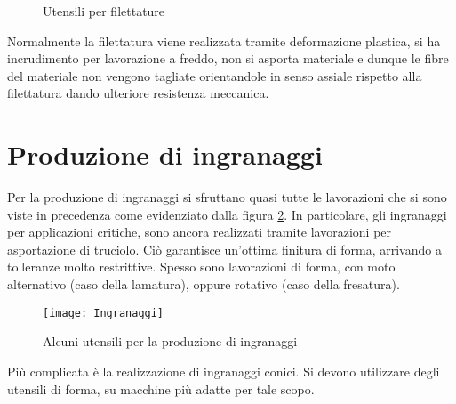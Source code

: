 \begin{figure}
\centering
{}\quad
{}
\caption{Utensili per filettature}
\label{fig:Filettature}
\end{figure}

Normalmente la filettatura viene realizzata tramite deformazione plastica,
si ha incrudimento per lavorazione a freddo, non si asporta materiale e dunque le fibre del materiale non vengono tagliate orientandole in senso
assiale rispetto alla filettatura dando ulteriore resistenza meccanica.

\section{Produzione di ingranaggi}\label{sc:Ingranaggi}
Per la produzione di ingranaggi si sfruttano quasi tutte le lavorazioni che si sono viste in precedenza come evidenziato dalla figura \ref{fig:Ingranaggi}.
In particolare, gli ingranaggi per applicazioni critiche, sono ancora realizzati tramite lavorazioni per asportazione di truciolo. Ciò garantisce un'ottima finitura di forma, arrivando a tolleranze molto restrittive.
Spesso sono lavorazioni di forma, con moto alternativo (caso della lamatura), oppure rotativo (caso della fresatura).

\begin{figure}
\centering
\texttt{[image: Ingranaggi]}
\caption{Alcuni utensili per la produzione di ingranaggi}
\label{fig:Ingranaggi}
\end{figure}

Più complicata è la realizzazione di ingranaggi conici.
Si devono utilizzare degli utensili di forma, su macchine più adatte per 
tale scopo.